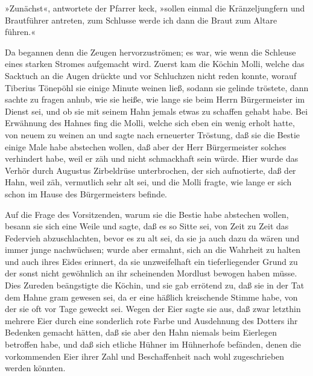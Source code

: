 »Zunächst«, antwortete der Pfarrer keck, »sollen einmal die
Kränzeljungfern und Brautführer antreten, zum Schlusse werde ich
dann die Braut zum Altare führen.«

Da begannen denn die Zeugen hervorzuströmen; es war, wie wenn die
Schleuse eines starken Stromes aufgemacht wird. Zuerst kam die
Köchin Molli, welche das Sacktuch an die Augen drückte und vor
Schluchzen nicht reden konnte, worauf Tiberius Tönepöhl sie einige
Minute weinen ließ,\pagenum{[27]} sodann sie gelinde tröstete,
dann sachte zu fragen anhub, wie sie heiße, wie lange sie beim
Herrn Bürgermeister im Dienst sei, und ob sie mit seinem Hahn
jemals etwas zu schaffen gehabt habe. Bei Erwähnung des Hahnes fing
die Molli, welche sich eben ein wenig erholt hatte, von neuem zu
weinen an und sagte nach erneuerter Tröstung, daß sie die Bestie
einige Male habe abstechen wollen, daß aber der Herr Bürgermeister
solches verhindert habe, weil er zäh und nicht schmackhaft sein
würde. Hier wurde das Verhör durch Augustus Zirbeldrüse
unterbrochen, der sich aufnotierte, daß der Hahn, weil zäh,
vermutlich sehr alt sei, und die Molli fragte, wie lange er sich
schon im Hause des Bürgermeisters befinde.

Auf die Frage des Vorsitzenden, warum sie die Bestie habe abstechen
wollen, besann sie sich eine Weile und sagte, daß es so Sitte sei,
von Zeit zu Zeit das Federvieh abzuschlachten, bevor es zu alt sei,
da sie ja auch dazu da wären und immer junge nachwüchsen; wurde
aber ermahnt, sich an die Wahrheit zu halten und auch ihres Eides
erinnert, da sie unzweifelhaft ein tieferliegender Grund zu der
sonst nicht gewöhnlich an ihr scheinenden Mordlust bewogen haben
müsse. Dies Zureden beängstigte die Köchin, und sie gab errötend
zu, daß sie in der Tat dem Hahne gram gewesen sei, da er eine
häßlich kreischende Stimme habe, von der sie oft vor Tage geweckt
sei. Wegen der Eier sagte sie aus, daß zwar letzthin mehrere Eier
durch eine sonderlich rote Farbe und Ausdehnung des Dotters ihr
Bedenken gemacht hätten, daß sie aber den Hahn niemals beim
Eierlegen betroffen habe, und daß sich etliche Hühner im Hühnerhofe
befänden, denen die vorkommenden Eier ihrer Zahl und Beschaffenheit
nach wohl zugeschrieben werden könnten.

